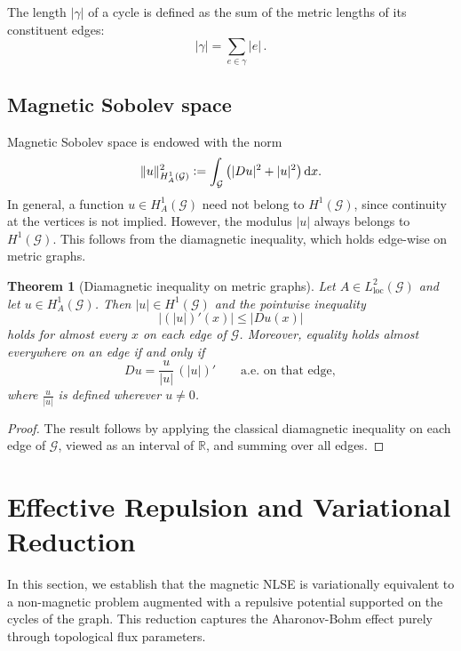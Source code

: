 \documentclass[12pt,a4paper]{amsart}
\theoremstyle{definition}
\theoremstyle{plain}
\newtheorem{theorem}[definition]{Theorem}
\newcommand{\defeq}{\vcentcolon=}
\numberwithin{equation}{section}
\begin{document}
The length $|\gamma|$ of a cycle is defined as the sum of the metric lengths of its constituent edges:
\[
    |\gamma| = \sum_{e \in \gamma} |e|\,.
\]

\subsection{Magnetic Sobolev space}
Magnetic Sobolev space is endowed with the norm
\begin{equation}
    \|u\|_{H^1_A(\mathcal{G})}^2 \defeq \int_{\mathcal{G}} \big( |Du|^2 + |u|^2 \big)\,\mathrm{d}x .
\end{equation}
In general, a function $u \in H^1_A(\mathcal{G})$ need not belong to $H^1(\mathcal{G})$, since continuity at the vertices is not implied.
However, the modulus $|u|$ always belongs to $H^1(\mathcal{G})$.
This follows from the diamagnetic inequality, which holds edge-wise on metric graphs.
\begin{theorem}[Diamagnetic inequality on metric graphs]
\label{diam}
Let $A \in L^2_{\mathrm{loc}}(\mathcal{G})$ and let $u \in H^1_A(\mathcal{G})$.
Then $|u| \in H^1(\mathcal{G})$ and the pointwise inequality
\begin{equation}
    \big|(|u|)'(x)\big| \le |Du(x)|
\end{equation}
holds for almost every $x$ on each edge of $\mathcal{G}$. Moreover, equality holds almost everywhere on an edge if and only if
\begin{equation}
    Du = \frac{u}{|u|}\,(|u|)' \qquad \text{a.e. on that edge},
\end{equation}
where $\frac{u}{|u|}$ is defined wherever $u\neq 0$.
\end{theorem}
\begin{proof}
The result follows by applying the classical diamagnetic inequality on each edge of $\mathcal{G}$,
viewed as an interval of $\mathbb{R}$, and summing over all edges.
\end{proof}


\section{Effective Repulsion and Variational Reduction}
\label{Sec4}

In this section, we establish that the magnetic NLSE is variationally equivalent to a non-magnetic problem augmented with a repulsive potential supported on the cycles of the graph. This reduction captures the Aharonov-Bohm effect purely through topological flux parameters.
\end{document}
